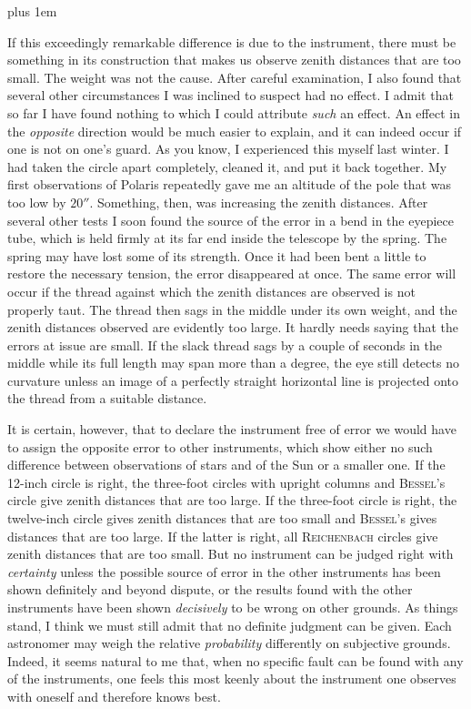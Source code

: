 {\rightskip=0pt plus 1em \par\indent If this exceedingly remarkable difference is due to the instrument, there must be something in its construction that makes us observe zenith distances that are too small. The weight was not the cause. After careful examination, I also found that several other circumstances I was inclined to suspect had no effect. I admit that so far I have found nothing to which I could attribute \emph{such} an effect. An effect in the \emph{opposite} direction would be much easier to explain, and it can indeed occur if one is not on one’s guard. As you know, I experienced this myself last winter. I had taken the circle apart completely, cleaned it, and put it back together. My first observations of Polaris repeatedly gave me an altitude of the pole that was too low by $20''$. Something, then, was increasing the zenith distances. After several other tests I soon found the source of the error in a bend in the eyepiece tube, which is held firmly  at its far end inside the telescope by the spring. The spring may have lost some of its strength. Once it had been bent a little to restore the necessary tension, the error disappeared at once. The same error will occur if the thread against which the zenith distances are observed is not properly taut. The thread then sags in the middle under its own weight, and the zenith distances observed are evidently too large. It hardly needs saying that the errors at issue are small. If the slack thread sags by a couple of seconds in the middle while its full length may span more than a degree, the eye still detects no curvature unless an image of a perfectly straight horizontal line is projected onto the thread from a suitable distance.\par}

\par\indent It is certain, however, that to declare the instrument free of error we would have to assign the opposite error to other instruments, which show either no such difference between observations of stars and of the Sun or a smaller one. If the 12-inch circle is right, the three-foot circles with upright columns and \textsc{Bessel}’s circle give zenith distances that are too large. If the three-foot circle is right, the twelve-inch circle gives zenith distances that are too small and \textsc{Bessel}’s gives distances that are too large. If the latter is right, all \textsc{Reichenbach} circles give zenith distances that are too small. But no instrument can be judged right with \emph{certainty} unless the possible source of error in the other instruments has been shown definitely and beyond dispute, or the results found with the other instruments have been shown \emph{decisively} to be wrong on other grounds. As things stand, I think we must still admit that no definite judgment can be given. Each astronomer may weigh the relative \emph{probability} differently on subjective grounds. Indeed, it seems natural to me that, when no specific fault can be found with any of the instruments, one feels this most keenly about the instrument one observes with oneself and therefore knows best.

